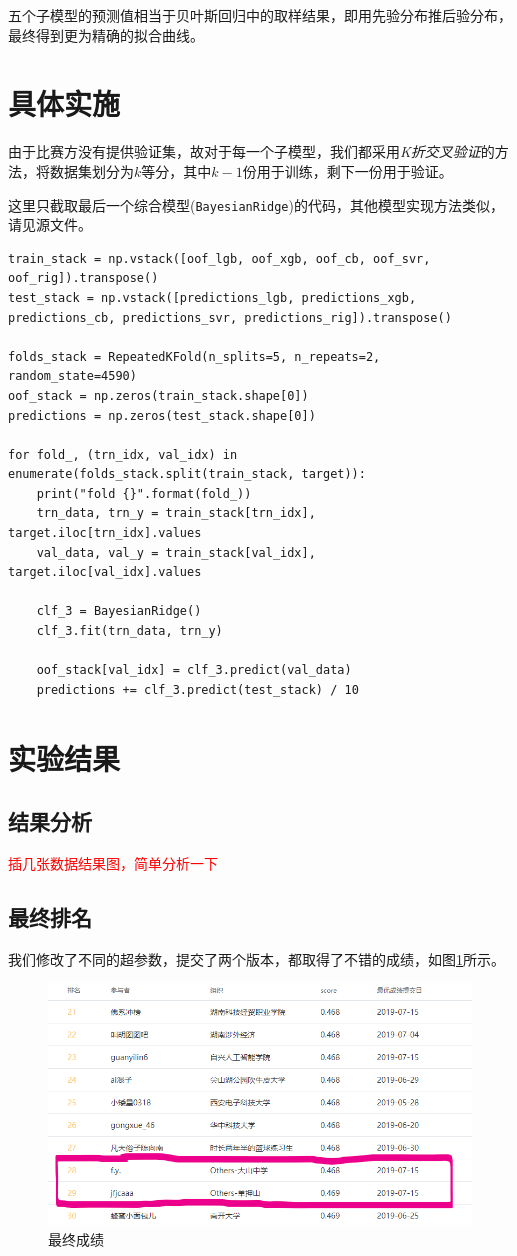\documentclass[logo,reportComp]{thesis}
\begin{document}
五个子模型的预测值相当于贝叶斯回归中的取样结果，即用先验分布推后验分布，最终得到更为精确的拟合曲线。


\section{具体实施}
由于比赛方没有提供验证集，故对于每一个子模型，我们都采用\emph{K折交叉验证}的方法，将数据集划分为$k$等分，其中$k-1$份用于训练，剩下一份用于验证。

这里只截取最后一个综合模型(\verb'BayesianRidge')的代码，其他模型实现方法类似，请见源文件。
\begin{lstlisting}
train_stack = np.vstack([oof_lgb, oof_xgb, oof_cb, oof_svr, oof_rig]).transpose()
test_stack = np.vstack([predictions_lgb, predictions_xgb, predictions_cb, predictions_svr, predictions_rig]).transpose()

folds_stack = RepeatedKFold(n_splits=5, n_repeats=2, random_state=4590)
oof_stack = np.zeros(train_stack.shape[0])
predictions = np.zeros(test_stack.shape[0])

for fold_, (trn_idx, val_idx) in enumerate(folds_stack.split(train_stack, target)):
    print("fold {}".format(fold_))
    trn_data, trn_y = train_stack[trn_idx], target.iloc[trn_idx].values
    val_data, val_y = train_stack[val_idx], target.iloc[val_idx].values

    clf_3 = BayesianRidge()
    clf_3.fit(trn_data, trn_y)

    oof_stack[val_idx] = clf_3.predict(val_data)
    predictions += clf_3.predict(test_stack) / 10
\end{lstlisting}

\section{实验结果}
\subsection{结果分析}
\textcolor{red}{插几张数据结果图，简单分析一下}


\subsection{最终排名}
我们修改了不同的超参数，提交了两个版本，都取得了不错的成绩，如图\ref{fig:ranking}所示。
\begin{figure}[H]
\centering
\includegraphics[width=0.7\linewidth]{fig/ranking-2.png}
\caption{最终成绩}
\label{fig:ranking}
\end{figure}
\end{document}
